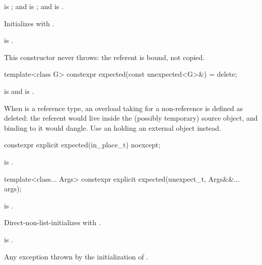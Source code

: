 \begin{itemdescr}
\pnum
\constraints
{} is ; and  is ; and  is .

\pnum
\effects
Initializes  with .

\pnum
\ensures
{} is .

\pnum
\remarks
This constructor never throws: the referent is bound, not copied.
\end{itemdescr}

%
\begin{itemdecl}
template<class G>
  constexpr expected(const unexpected<G>&) = delete;
\end{itemdecl}

\begin{itemdescr}
\pnum
\constraints
{} is  and  is .

\pnum
\remarks
When  is a reference type, an overload taking  for a non-reference  is defined as deleted: the referent would live inside the (possibly temporary) source  object, and binding  to it would dangle. Use an  holding an external object instead.
\end{itemdescr}

%
\begin{itemdecl}
constexpr explicit expected(in_place_t) noexcept;
\end{itemdecl}

\begin{itemdescr}
\pnum
\ensures
{} is .
\end{itemdescr}

%
\begin{itemdecl}
template<class... Args>
  constexpr explicit expected(unexpect_t, Args&&... args);
\end{itemdecl}

\begin{itemdescr}
\pnum
\constraints
{} is .

\pnum
\effects
Direct-non-list-initializes  with .

\pnum
\ensures
{} is .

\pnum
\throws
Any exception thrown by the initialization of .
\end{itemdescr}

